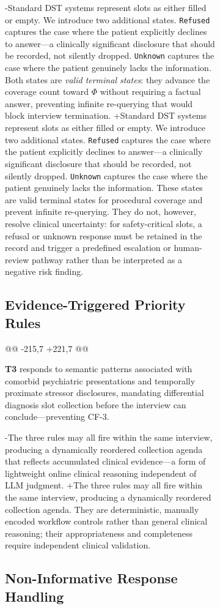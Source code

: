 \begin{figure}[t]
{\begin{figure}[!t]
{-Standard DST systems represent slots as either filled or empty. We introduce two additional states. \texttt{Refused} captures the case where the patient explicitly declines to answer---a clinically significant disclosure that should be recorded, not silently dropped. \texttt{Unknown} captures the case where the patient genuinely lacks the information. Both states are \textit{valid terminal states}: they advance the coverage count toward $\Phi$ without requiring a factual answer, preventing infinite re-querying that would block interview termination.
+Standard DST systems represent slots as either filled or empty. We introduce two additional states. \texttt{Refused} captures the case where the patient explicitly declines to answer---a clinically significant disclosure that should be recorded, not silently dropped. \texttt{Unknown} captures the case where the patient genuinely lacks the information. These states are valid terminal states for procedural coverage and prevent infinite re-querying. They do not, however, resolve clinical uncertainty: for safety-critical slots, a refusal or unknown response must be retained in the record and trigger a predefined escalation or human-review pathway rather than be interpreted as a negative risk finding.
 
 \subsection{Evidence-Triggered Priority Rules}
 
@@ -215,7 +221,7 @@
 
 \textbf{T3} responds to semantic patterns associated with comorbid psychiatric presentations and temporally proximate stressor disclosures, mandating differential diagnosis slot collection before the interview can conclude---preventing CF-3.
 
-The three rules may all fire within the same interview, producing a dynamically reordered collection agenda that reflects accumulated clinical evidence---a form of lightweight online clinical reasoning independent of LLM judgment.
+The three rules may all fire within the same interview, producing a dynamically reordered collection agenda. They are deterministic, manually encoded workflow controls rather than general clinical reasoning; their appropriateness and completeness require independent clinical validation.
 
 \subsection{Non-Informative Response Handling}
 
}
\end{figure}}
\end{figure}
